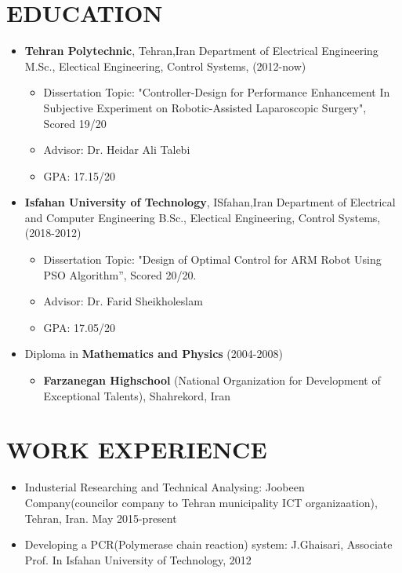 \documentclass[margin,11pt]{res}
\begin{document}
\vspace{-2cm}
\address{Departement of Electrical Engineering \\ Amirkabir University\\ Tehran, Iran}
\address{{\bf Phone:} +98 (913) 7021784\\ {\bf E-mail:} s.etedali@aut.ac.ir}
\begin{resume}
\section{EDUCATION}
\begin{itemize}
			\item 
				{\bf Tehran Polytechnic}, Tehran,Iran
				Department of Electrical Engineering	
				M.Sc., Electical Engineering, Control Systems, (2012-now)		
				\begin{itemize}
					\item
						Dissertation Topic: "Controller-Design for Performance Enhancement In Subjective Experiment on Robotic-Assisted Laparoscopic Surgery", Scored 19/20
					\item
						Advisor:  Dr. Heidar Ali Talebi
					\item
						GPA: 17.15/20

				\end{itemize}
\item 
				{\bf Isfahan University of Technology}, ISfahan,Iran
				Department of Electrical and Computer Engineering	
				B.Sc., Electical Engineering, Control Systems, (2018-2012)		
				\begin{itemize}
					\item
						Dissertation Topic: "Design of Optimal Control for ARM Robot Using PSO Algorithm”, Scored 20/20.
					\item
						Advisor:  Dr. Farid Sheikholeslam
					\item
						GPA: 17.05/20

				\end{itemize}
			\item
			Diploma in {\bf Mathematics and Physics} (2004-2008)
				\begin{itemize}
					\item
					{\bf Farzanegan Highschool} (National Organization for Development of Exceptional Talents), Shahrekord, Iran
				\end{itemize}
		\end{itemize} 
\section{WORK EXPERIENCE}
\begin{itemize}
\item
						Industerial Researching and Technical Analysing: Joobeen Company(councilor company to  Tehran municipality ICT organizaation), Tehran, Iran. May 2015-present
					\item
						Developing a PCR(Polymerase chain reaction) system: J.Ghaisari, Associate Prof. In
Isfahan University of Technology, 2012
					

\end{itemize}
\end{resume}
\end{document}
